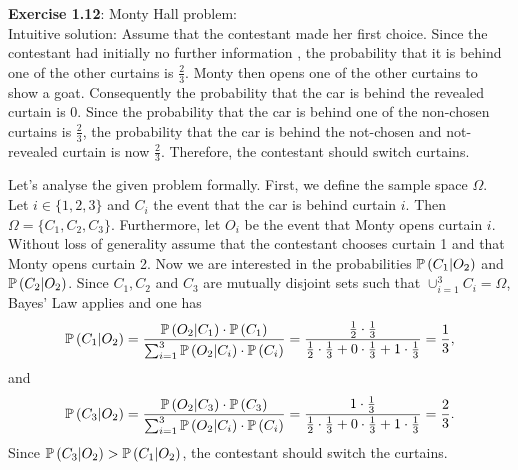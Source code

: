 \textbf{Exercise 1.12}: Monty Hall problem: \\
Intuitive solution: Assume that the contestant made her first choice. Since the
contestant had initially no further information , the probability that it is
behind one of the other curtains is $\frac{2}{3}$. Monty then opens one of the
other curtains to show a goat. Consequently the probability that the car is behind
the revealed curtain is 0. Since the probability that the car is behind one
of the non-chosen curtains is $\frac{2}{3}$, the probability that the car is behind
the not-chosen and not-revealed curtain is now $\frac{2}{3}$. Therefore, the
contestant should switch curtains.

Let's analyse the given problem formally. First, we define the sample space $\Omega$.
Let $i \in \{ 1, 2, 3 \}$ and $C_i$ the event that the car is behind curtain $i$.
Then $\Omega = \{ C_1, C_2, C_3 \}$. Furthermore, let $O_i$ be the event that Monty
opens curtain $i$. Without loss of generality assume that the contestant chooses
curtain 1 and that Monty opens curtain 2. Now we are interested in the probabilities
$\mathbb{P}\left(C_1 | O_2\right)$ and $\mathbb{P}\left(C_2 | O_2\right)$. Since $C_1, C_2$ and
$C_3$ are mutually disjoint sets such that $\cup_{i=1}^3 C_i = \Omega$, Bayes' Law
applies and one has
\[
  \mathbb{P}\left(C_1 | O_2\right)
    = \frac {\mathbb{P}\left(O_2 | C_1\right) \cdot \mathbb{P}\left(C_1 \right)} {\sum_{i=1}^3 \mathbb{P}\left(O_2 | C_i\right) \cdot \mathbb{P}\left(C_i\right)}
    = \frac {\frac{1}{2} \cdot \frac{1}{3}}{\frac{1}{2} \cdot \frac{1}{3} + 0 \cdot \frac{1}{3} + 1 \cdot \frac{1}{3}}
    = \frac{1}{3},
\]
and
\[
  \mathbb{P}\left(C_3 | O_2\right)
    = \frac {\mathbb{P}\left(O_2 | C_3\right) \cdot \mathbb{P}\left(C_3 \right)}{\sum_{i=1}^3 \mathbb{P}\left(O_2 | C_i\right) \cdot \mathbb{P}\left(C_i\right)}
    = \frac {1 \cdot \frac{1}{3}}{\frac{1}{2} \cdot \frac{1}{3} + 0 \cdot \frac{1}{3} + 1 \cdot \frac{1}{3}}
    = \frac{2}{3}.
\]
Since $\mathbb{P}\left(C_3 | O_2\right) > \mathbb{P}\left(C_1 | O_2\right)$, the contestant
should switch the curtains.
\\[0.5cm]
